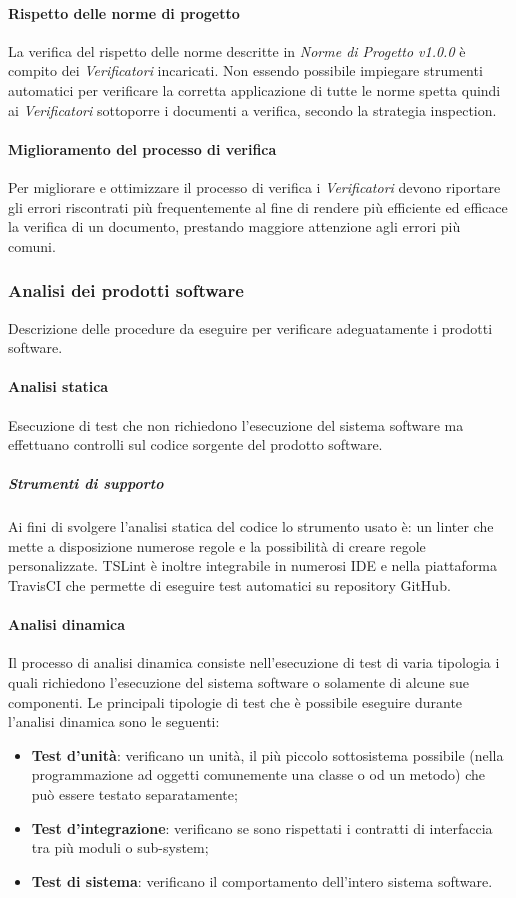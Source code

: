\paragraph{Rispetto delle norme di progetto} \Spazio
La verifica del rispetto delle norme descritte in \emph{Norme di Progetto v1.0.0} è compito dei \emph{Verificatori} incaricati. Non essendo possibile impiegare strumenti automatici per verificare la corretta applicazione di tutte le norme spetta quindi ai \emph{Verificatori} sottoporre i documenti a verifica, secondo la strategia inspection.

\paragraph{Miglioramento del processo di verifica} \Spazio
Per migliorare e ottimizzare il processo di verifica i \emph{Verificatori} devono riportare gli errori riscontrati più frequentemente al fine di rendere più efficiente ed efficace la verifica di un documento, prestando maggiore attenzione agli errori più comuni.
\subsubsection{Analisi dei prodotti software}
Descrizione delle procedure da eseguire per verificare adeguatamente i prodotti software.
\paragraph{Analisi statica}\Spazio
Esecuzione di test che non richiedono l'esecuzione del sistema software ma effettuano controlli sul codice sorgente del prodotto software.
\subparagraph{Strumenti di supporto}\Spazio
Ai fini di svolgere l'analisi statica del codice lo strumento usato è:  un linter che mette a disposizione numerose regole e la possibilità di creare regole personalizzate. TSLint è inoltre integrabile in numerosi IDE e nella piattaforma TravisCI che permette di eseguire test automatici su repository GitHub.
\paragraph{Analisi dinamica}\Spazio
Il processo di analisi dinamica consiste nell'esecuzione di test di varia tipologia i quali richiedono l'esecuzione del sistema software o solamente di alcune sue componenti.
Le principali tipologie di test che è possibile eseguire durante l'analisi dinamica sono le seguenti:
\begin{itemize}
	\item {\textbf{Test d'unità}: verificano un unità, il più piccolo sottosistema possibile (nella programmazione ad oggetti comunemente una classe o od un metodo) che può essere testato separatamente;}
	\item {\textbf{Test d'integrazione}: verificano se sono rispettati i contratti di interfaccia tra più moduli o sub-system;}
	\item {\textbf{Test di sistema}: verificano il comportamento dell’intero sistema software.}
\end{itemize}

